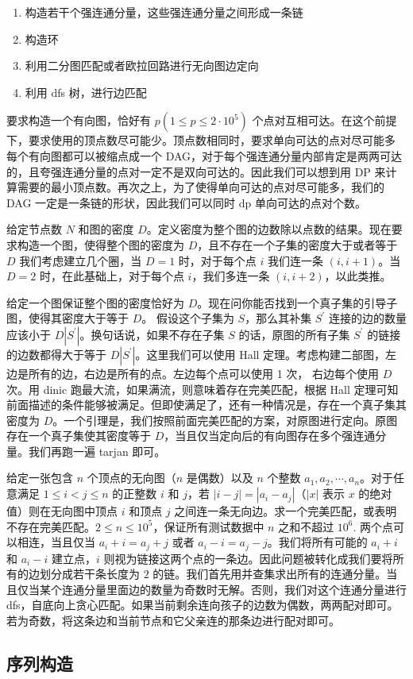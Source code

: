 \begin{enumerate}
    \item 构造若干个强连通分量，这些强连通分量之间形成一条链
    \item 构造环
    \item 利用二分图匹配或者欧拉回路进行无向图边定向
    \item 利用 dfs 树，进行边匹配
\end{enumerate}


\prob 要求构造一个有向图，恰好有 $p (1 \leq p \leq 2 \cdot 10^5)$ 个点对互相可达。在这个前提下，要求使用的顶点数尽可能少。顶点数相同时，要求单向可达的点对尽可能多
\sol 每个有向图都可以被缩点成一个 DAG，对于每个强连通分量内部肯定是两两可达的，且夸强连通分量的点对一定不是双向可达的。因此我们可以想到用 DP 来计算需要的最小顶点数。再次之上，为了使得单向可达的点对尽可能多，我们的 DAG 一定是一条链的形状，因此我们可以同时 dp 单向可达的点对个数。

\prob 给定节点数 $N$ 和图的密度 $D$。定义密度为整个图的边数除以点数的结果。现在要求构造一个图，使得整个图的密度为 $D$，且不存在一个子集的密度大于或者等于 $D$
\sol 我们考虑建立几个圈，当 $D=1$ 时，对于每个点 $i$ 我们连一条 $(i, i+1)$。当 $D=2$ 时，在此基础上，对于每个点 $i$，我们多连一条 $(i, i+2)$，以此类推。

\prob 给定一个图保证整个图的密度恰好为 $D$。现在问你能否找到一个真子集的引导子图，使得其密度大于等于 $D$。
\sol 假设这个子集为 $S$，那么其补集 $S^{\prime}$ 连接的边的数量应该小于 $D|S^{\prime}|$。换句话说，如果不存在子集 $S$ 的话，原图的所有子集 $S^{\prime}$ 的链接的边数都得大于等于 $D|S^{\prime}|$。这里我们可以使用 Hall 定理。考虑构建二部图，左边是所有的边，右边是所有的点。左边每个点可以使用 1 次， 右边每个使用 $D$ 次。用 dinic 跑最大流，如果满流，则意味着存在完美匹配，根据 Hall 定理可知前面描述的条件能够被满足。但即使满足了，还有一种情况是，存在一个真子集其密度为 $D$。一个引理是，我们按照前面完美匹配的方案，对原图进行定向。原图存在一个真子集使其密度等于 $D$，当且仅当定向后的有向图存在多个强连通分量。我们再跑一遍 tarjan 即可。


\prob 给定一张包含 $n$ 个顶点的无向图（$n$ 是偶数）以及 $n$ 个整数 $a_1, a_2,\cdots, a_n$。对于任意满足 $1 \leq i < j \leq n$ 的正整数 $i$ 和 $j$，若 $|i − j| = |a_i − a_j|$（$|x|$ 表示 $x$ 的绝对值）则在无向图中顶点 $i$ 和顶点 $j$ 之间连一条无向边。求一个完美匹配，或表明不存在完美匹配。$2 \leq n \leq 10^5$，保证所有测试数据中 $n$ 之和不超过 $10^6$.
\sol 两个点可以相连，当且仅当 $a_i+i=a_j+j$ 或者 $a_i-i=a_j-j$。我们将所有可能的 $a_i+i$ 和 $a_i-i$ 建立点，$i$ 则视为链接这两个点的一条边。因此问题被转化成我们要将所有的边划分成若干条长度为 $2$ 的链。我们首先用并查集求出所有的连通分量。当且仅当某个连通分量里面边的数量为奇数时无解。否则，我们对这个连通分量进行 dfs，自底向上贪心匹配。如果当前剩余连向孩子的边数为偶数，两两配对即可。若为奇数，将这条边和当前节点和它父亲连的那条边进行配对即可。   

\subsection{序列构造}
